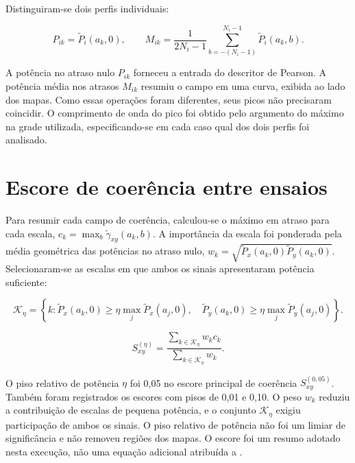 Distinguiram-se dois perfis individuais:

\begin{equation}\label{eq:met-perfis}
  P_{ik}=\widetilde P_i(a_k,0),\qquad
  M_{ik}=\frac{1}{2N_i-1}\sum_{b=-(N_i-1)}^{N_i-1}\widetilde P_i(a_k,b).
\end{equation}

\noindent
A potência no atraso nulo $P_{ik}$ forneceu a entrada do descritor de Pearson.
A potência média nos atrasos $M_{ik}$ resumiu o campo em uma curva, exibida ao lado
dos mapas. Como essas operações foram diferentes, seus picos não precisaram
coincidir. O comprimento de onda do pico foi obtido pelo argumento do máximo na
grade utilizada, especificando-se em cada caso qual dos dois perfis foi analisado.

\section{Escore de coerência entre ensaios}\label{sec:met-escore}

Para resumir cada campo de coerência, calculou-se o máximo em atraso para cada
escala, $c_k=\max_b\widetilde\gamma_{xy}(a_k,b)$. A importância da escala foi
ponderada pela média geométrica das potências no atraso nulo,
$w_k=\sqrt{\widetilde P_x(a_k,0)\widetilde P_y(a_k,0)}$. Selecionaram-se as
escalas em que ambos os sinais apresentaram potência suficiente:

\begin{equation}\label{eq:met-piso}
  \mathcal K_\eta=\left\{k:
  \widetilde P_x(a_k,0)\geq\eta\max_j\widetilde P_x(a_j,0),\quad
  \widetilde P_y(a_k,0)\geq\eta\max_j\widetilde P_y(a_j,0)\right\}.
\end{equation}

\begin{equation}\label{eq:met-escore}
  S_{xy}^{(\eta)}=
  \frac{\sum_{k\in\mathcal K_\eta}w_kc_k}
       {\sum_{k\in\mathcal K_\eta}w_k}.
\end{equation}

\noindent
O piso relativo de potência $\eta$ foi 0,05 no escore principal de coerência
$S_{xy}^{(0,05)}$. Também foram registrados os escores com pisos de 0,01 e 0,10.
O peso $w_k$ reduziu a contribuição de escalas de pequena potência, e o conjunto
$\mathcal K_\eta$ exigiu participação de ambos os sinais. O piso relativo de
potência não foi um limiar de significância e não removeu regiões dos mapas.
O escore foi um resumo adotado nesta execução, não uma equação adicional atribuída
a .

